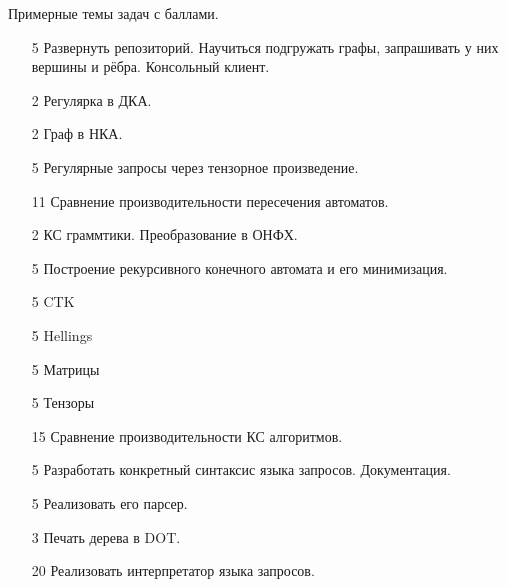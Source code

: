 Примерные темы задач с баллами.
\begin{enumerate}
  \item [5] Развернуть репозиторий. Научиться подгружать графы, запрашивать у них вершины и рёбра. Консольный клиент.
  \item [2] Регулярка в ДКА. 
  \item [2] Граф в НКА.
  \item [5] Регулярные запросы через тензорное произведение. 
  \item [11] Сравнение производительности пересечения автоматов.
  \item [2] КС граммтики. Преобразование в ОНФХ. 
  \item [5] Построение рекурсивного конечного автомата и его минимизация.
  \item [5] CTK
  \item [5] Hellings
  \item [5] Матрицы
  \item [5] Тензоры
  \item [15] Сравнение производительности КС алгоритмов.
  \item [5] Разработать конкретный синтаксис языка запросов. Документация. 
  \item [5] Реализовать его парсер.
  \item [3] Печать дерева в DOT.
  \item [20] Реализовать интерпретатор языка запросов.
\end{enumerate}